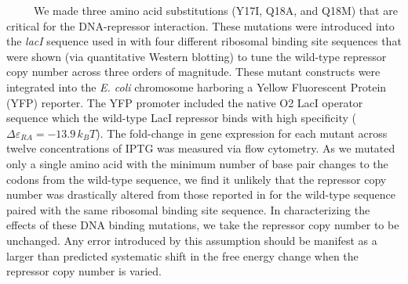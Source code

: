 \documentclass[12pt]{caltech_thesis}
\begin{document}
~~~~~We made three amino acid substitutions (Y17I, Q18A, and Q18M) that
are critical for the DNA-repressor interaction. These mutations were
introduced into the \emph{lacI} sequence used in \textcite{garcia2011}
with four different ribosomal binding site sequences that were shown
(via quantitative Western blotting) to tune the wild-type repressor copy
number across three orders of magnitude. These mutant constructs were
integrated into the \emph{E. coli} chromosome harboring a Yellow
Fluorescent Protein (YFP) reporter. The YFP promoter included the native
O2 LacI operator sequence which the wild-type LacI repressor binds with
high specificity (\(\Delta\varepsilon_{RA} = -13.9\, k_BT\)). The
fold-change in gene expression for each mutant across twelve
concentrations of IPTG was measured via flow cytometry. As we mutated
only a single amino acid with the minimum number of base pair changes to
the codons from the wild-type sequence, we find it unlikely that the
repressor copy number was drastically altered from those reported in
\textcite{garcia2011} for the wild-type sequence paired with the same
ribosomal binding site sequence. In characterizing the effects of these
DNA binding mutations, we take the repressor copy number to be
unchanged. Any error introduced by this assumption should be manifest as
a larger than predicted systematic shift in the free energy change when
the repressor copy number is varied.
\end{document}
